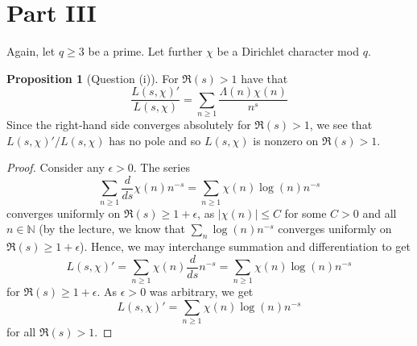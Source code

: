 \documentclass{scrartcl}
\newcommand{\N}{\mathbb{N}}
\theoremstyle{definition}
\newtheorem{proposition}[definition]{Proposition}
\begin{document}
\section{Part III}
Again, let $q \geq 3$ be a prime.
Let further $\chi$ be a Dirichlet character mod $q$.
\begin{proposition}[Question (i)]
    \label{prop:logarithmic_derivative_L}
    For $\Re(s) > 1$ have that
    \begin{equation*}
        \frac {L(s, \chi)'} {L(s, \chi)} = \sum_{n \geq 1} \frac {\Lambda(n) \chi(n)} {n^s}
    \end{equation*}
    Since the right-hand side converges absolutely for $\Re(s) > 1$, we see that $L(s, \chi)'/L(s, \chi)$ has no pole and so $L(s, \chi)$ is nonzero on $\Re(s) > 1$.
\end{proposition}
\begin{proof}
    Consider any $\epsilon > 0$. The series
    \begin{equation*}
        \sum_{n \geq 1} \frac d {ds} \chi(n) n^{-s} = \sum_{n \geq 1} \chi(n) \log(n) n^{-s}
    \end{equation*}
    converges uniformly on $\Re(s) \geq 1 + \epsilon$, as $|\chi(n)| \leq C$ for some $C > 0$ and all $n \in \N$ (by the lecture, we know that $\sum_n \log(n) n^{-s}$ converges uniformly on $\Re(s) \geq 1 + \epsilon$).
    Hence, we may interchange summation and differentiation to get
    \begin{equation*}
        L(s, \chi)' = \sum_{n \geq 1} \chi(n) \frac d {ds} n^{-s} = \sum_{n \geq 1} \chi(n) \log(n) n^{-s}
    \end{equation*}
    for $\Re(s) \geq 1 + \epsilon$.
    As $\epsilon > 0$ was arbitrary, we get
    \begin{equation*}
        L(s, \chi)' = \sum_{n \geq 1} \chi(n) \log(n) n^{-s}
    \end{equation*}
    for all $\Re(s) > 1$.


\end{proof}
\end{document}
